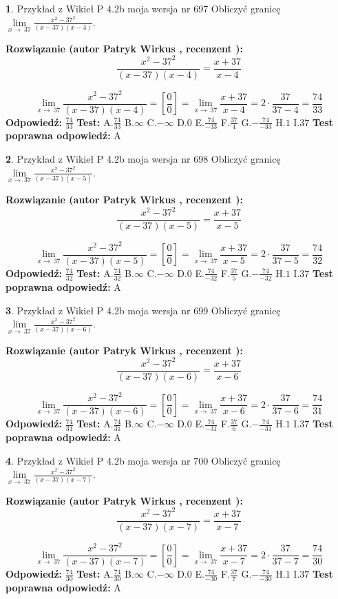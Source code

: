 \documentclass[12pt, a4paper]{article}
\theoremstyle{definition} %
\newtheorem{zad}{}
\newcommand{\zadStart}[1]{\begin{zad}#1\newline}
\newcommand{\zadStop}{\end{zad}}
\newcommand{\rozwStart}[2]{\noindent \textbf{Rozwiązanie (autor #1 , recenzent #2): }\newline}
\newcommand{\rozwStop}{\newline}
\newcommand{\odpStart}{\noindent \textbf{Odpowiedź:}\newline}
\newcommand{\odpStop}{\newline}
\newcommand{\testStart}{\noindent \textbf{Test:}\newline}
\newcommand{\testStop}{\newline}
\newcommand{\kluczStart}{\noindent \textbf{Test poprawna odpowiedź:}\newline}
\newcommand{\kluczStop}{\newline}
\begin{document}
\zadStart{Przykład z Wikieł P 4.2b moja wersja nr 697}
Obliczyć granicę $\lim\limits_{x\to\ 37}\frac{x^{2}-37^{2}}{(x-37)(x-4)}$.
\zadStop
\rozwStart{Patryk Wirkus}{}
$$\frac{x^{2}-37^{2}}{(x-37)(x-4)}=\frac{x+37}{x-4}$$

$$\lim\limits_{x\to\ 37}\frac{x^{2}-37^{2}}{(x-37)(x-4)}=[\frac{0}{0}]=\lim\limits_{x\to\ 37}\frac{x+37}{x-4}=2 \cdot \frac{37}{37-4} = \frac{74}{33}$$
\rozwStop
\odpStart
$\frac{74}{33}$
\odpStop
\testStart
A.$\frac{74}{33}$
B.$\infty$
C.$-\infty$
D.$0$
E.$\frac{74}{-33}$
F.$\frac{37}{4}$
G.$-\frac{74}{-33}$
H.$1$
I.$37$
\testStop
\kluczStart
A
\kluczStop



\zadStart{Przykład z Wikieł P 4.2b moja wersja nr 698}
Obliczyć granicę $\lim\limits_{x\to\ 37}\frac{x^{2}-37^{2}}{(x-37)(x-5)}$.
\zadStop
\rozwStart{Patryk Wirkus}{}
$$\frac{x^{2}-37^{2}}{(x-37)(x-5)}=\frac{x+37}{x-5}$$

$$\lim\limits_{x\to\ 37}\frac{x^{2}-37^{2}}{(x-37)(x-5)}=[\frac{0}{0}]=\lim\limits_{x\to\ 37}\frac{x+37}{x-5}=2 \cdot \frac{37}{37-5} = \frac{74}{32}$$
\rozwStop
\odpStart
$\frac{74}{32}$
\odpStop
\testStart
A.$\frac{74}{32}$
B.$\infty$
C.$-\infty$
D.$0$
E.$\frac{74}{-32}$
F.$\frac{37}{5}$
G.$-\frac{74}{-32}$
H.$1$
I.$37$
\testStop
\kluczStart
A
\kluczStop



\zadStart{Przykład z Wikieł P 4.2b moja wersja nr 699}
Obliczyć granicę $\lim\limits_{x\to\ 37}\frac{x^{2}-37^{2}}{(x-37)(x-6)}$.
\zadStop
\rozwStart{Patryk Wirkus}{}
$$\frac{x^{2}-37^{2}}{(x-37)(x-6)}=\frac{x+37}{x-6}$$

$$\lim\limits_{x\to\ 37}\frac{x^{2}-37^{2}}{(x-37)(x-6)}=[\frac{0}{0}]=\lim\limits_{x\to\ 37}\frac{x+37}{x-6}=2 \cdot \frac{37}{37-6} = \frac{74}{31}$$
\rozwStop
\odpStart
$\frac{74}{31}$
\odpStop
\testStart
A.$\frac{74}{31}$
B.$\infty$
C.$-\infty$
D.$0$
E.$\frac{74}{-31}$
F.$\frac{37}{6}$
G.$-\frac{74}{-31}$
H.$1$
I.$37$
\testStop
\kluczStart
A
\kluczStop



\zadStart{Przykład z Wikieł P 4.2b moja wersja nr 700}
Obliczyć granicę $\lim\limits_{x\to\ 37}\frac{x^{2}-37^{2}}{(x-37)(x-7)}$.
\zadStop
\rozwStart{Patryk Wirkus}{}
$$\frac{x^{2}-37^{2}}{(x-37)(x-7)}=\frac{x+37}{x-7}$$

$$\lim\limits_{x\to\ 37}\frac{x^{2}-37^{2}}{(x-37)(x-7)}=[\frac{0}{0}]=\lim\limits_{x\to\ 37}\frac{x+37}{x-7}=2 \cdot \frac{37}{37-7} = \frac{74}{30}$$
\rozwStop
\odpStart
$\frac{74}{30}$
\odpStop
\testStart
A.$\frac{74}{30}$
B.$\infty$
C.$-\infty$
D.$0$
E.$\frac{74}{-30}$
F.$\frac{37}{7}$
G.$-\frac{74}{-30}$
H.$1$
I.$37$
\testStop
\kluczStart
A
\kluczStop
\end{document}
